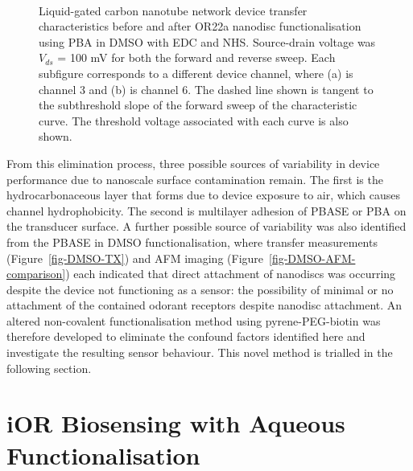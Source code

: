 \documentclass[
  a4paper,
]{scrbook}
\begin{document}
\begin{figure}
\begin{minipage}[t]{0.45\linewidth}
{{}

}

\end{minipage}%
%
\begin{minipage}[t]{0.01\linewidth}

{\centering 

~

}

\end{minipage}%

\caption[Liquid-gated carbon nanotube network device transfer
characteristics before and after OR22a nanodisc functionalisation using
PBA in DMSO with EDC and NHS, with threshold voltage shown alongside
each transfer curve.]{\label{fig-EDCNHS-TX}Liquid-gated carbon nanotube
network device transfer characteristics before and after OR22a nanodisc
functionalisation using PBA in DMSO with EDC and NHS. Source-drain
voltage was \(V_{ds}\) = 100 mV for both the forward and reverse sweep.
Each subfigure corresponds to a different device channel, where (a) is
channel 3 and (b) is channel 6. The dashed line shown is tangent to the
subthreshold slope of the forward sweep of the characteristic curve. The
threshold voltage associated with each curve is also shown.}

\end{figure}

From this elimination process, three possible sources of variability in
device performance due to nanoscale surface contamination remain. The
first is the hydrocarbonaceous layer that forms due to device exposure
to air, which causes channel hydrophobicity. The second is multilayer
adhesion of PBASE or PBA on the transducer surface. A further possible
source of variability was also identified from the PBASE in DMSO
functionalisation, where transfer measurements
(Figure~\ref{fig-DMSO-TX}) and AFM imaging
(Figure~\ref{fig-DMSO-AFM-comparison}) each indicated that direct
attachment of nanodiscs was occurring despite the device not functioning
as a sensor: the possibility of minimal or no attachment of the
contained odorant receptors despite nanodisc attachment. An altered
non-covalent functionalisation method using pyrene-PEG-biotin was
therefore developed to eliminate the confound factors identified here
and investigate the resulting sensor behaviour. This novel method is
trialled in the following section.

\hypertarget{sec-aqueous-functionalisation-biosensing}{%
\section{iOR Biosensing with Aqueous
Functionalisation}\label{sec-aqueous-functionalisation-biosensing}}
\end{document}
